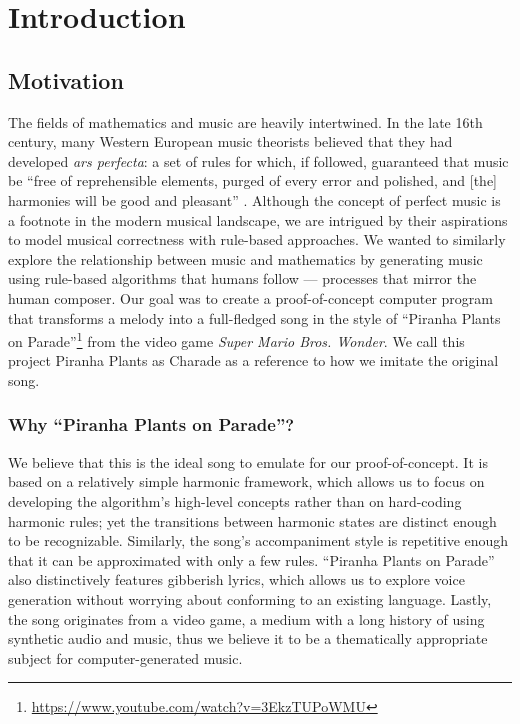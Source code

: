 \section{Introduction}

\subsection{Motivation}

The fields of mathematics and music are heavily intertwined. In the late 16th century, many Western European music theorists believed that they had developed \emph{ars perfecta}: a set of rules for which, if followed, guaranteed that music be ``free of reprehensible elements, purged of every error and polished, and [the] harmonies will be good and pleasant'' \autocite{Richard:2005}. Although the concept of perfect music is a footnote in the modern musical landscape, we are intrigued by their aspirations to model musical correctness with rule-based approaches. We wanted to similarly explore the relationship between music and mathematics by generating music using rule-based algorithms that humans follow --- processes that mirror the human composer. Our goal was to create a proof-of-concept computer program that transforms a melody into a full-fledged song in the style of ``Piranha Plants on Parade''\footnote{\url{https://www.youtube.com/watch?v=3EkzTUPoWMU}} from the video game \emph{Super Mario Bros. Wonder}. We call this project Piranha Plants as Charade as a reference to how we imitate the original song.

\subsubsection{Why ``Piranha Plants on Parade''?}

We believe that this is the ideal song to emulate for our proof-of-concept. It is based on a relatively simple harmonic framework, which allows us to focus on developing the algorithm's high-level concepts rather than on hard-coding harmonic rules; yet the transitions between harmonic states are distinct enough to be recognizable. Similarly, the song's accompaniment style is repetitive enough that it can be approximated with only a few rules. ``Piranha Plants on Parade'' also distinctively features gibberish lyrics, which allows us to explore voice generation without worrying about conforming to an existing language. Lastly, the song originates from a video game, a medium with a long history of using synthetic audio and music, thus we believe it to be a thematically appropriate subject for computer-generated music.

